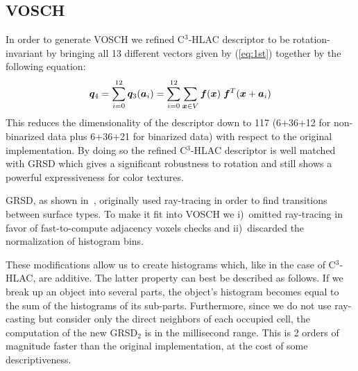 \documentclass[letterpaper, 10 pt, conference]{sty/ieeeconf}
\begin{document}
\subsection{VOSCH}
\label{sec:VOSCH}
In order to generate VOSCH we refined C$^3$-HLAC descriptor to be rotation-invariant by bringing all  
13 different vectors given by (\ref{eq:1st}) together by the following equation: 
\begin{equation}\label{eq:1st_new}
  {\bm q_4} = \sum_{i=0}^{12} {\bm q_3}({\bm a}_i) = \sum_{i=0}^{12}\sum_{{\bm x} \in V} \bm{f}({\bm x}) \hspace{1mm}\bm{f}^T({\bm x}+{\bm a_i}) \\
\end{equation}
%
This reduces the dimensionality of the descriptor down to 117 (6+36+12 for non-binarized data plus 6+36+21 
for binarized data) with respect to the original implementation. 
By doing so the refined C$^3$-HLAC descriptor is well matched with GRSD which gives a significant 
robustness to rotation and still shows a powerful expressiveness for color textures.

GRSD, as shown in~\cite{GRSD10Humanoids}, originally used
ray-tracing in order to find transitions between surface types. To make it fit into VOSCH 
we i)~omitted ray-tracing in favor of fast-to-compute adjacency voxels checks and ii)~discarded
the normalization of histogram bins.

These modifications allow us to create histograms which, like in the case of C$^3$-HLAC, are additive.
The latter property can best be described as follows. 
If we break up an object into several parts, 
the object's histogram becomes equal to the sum of the histograms of its sub-parts. 
%
%
 Furthermore, since we do not use ray-casting but 
consider only the direct neighbors of each occupied cell, the computation of the new GRSD$_2$ is in 
the millisecond range. This is 2 orders of magnitude faster than the original implementation,
at the cost of some descriptiveness.
\end{document}
